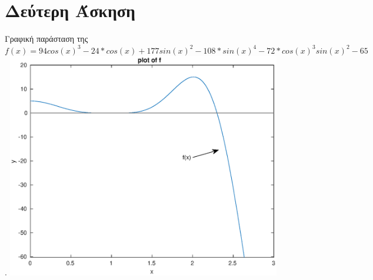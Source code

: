 \documentclass[a4paper,11pt]{article}
\begin{document}
\section{Δεύτερη Άσκηση}
\begin{center}
    Γραφική παράσταση της\\ $f(x)=
    94cos(x)^3-24*cos(x)+177sin(x)^2-108*sin(x)^4-72*cos(x)^3sin(x)^2-65$.
    \includegraphics[width=12cm]{ask2.eps}\\
\end{center}
\end{document}
